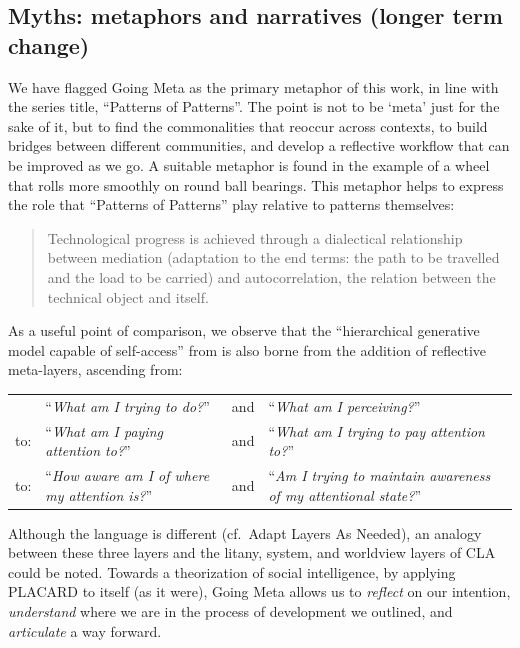\documentclass[acmlarge,timestamp]{acmart}
\begin{document}
\subsection{Myths: metaphors and narratives (longer term change)}
We have flagged {\sc Going Meta} as the primary metaphor of this work,
in line with the series title, “Patterns of Patterns”.  The point is
not to be ‘meta’ just for the sake of it, but to find the
commonalities that reoccur across contexts, to build bridges between
different communities, and develop a reflective workflow that can be
improved as we go.  A suitable metaphor is found in the example of a
wheel that rolls more smoothly on round ball bearings.  This metaphor
helps to express the role that “Patterns of Patterns” play relative to
patterns themselves:
\begin{quote}
Technological progress is achieved through a dialectical relationship
between mediation (adaptation to the end terms: the path to be
travelled and the load to be carried) and autocorrelation, the
relation between the technical object and
itself. \cite{Simondon2005-pq}
\end{quote}
As a useful point of comparison, we observe that the “hierarchical
generative model capable of self-access” from
\citet{albarracin2023designing} is also borne from the addition of
reflective meta-layers, ascending from:

{
\renewcommand*{\arraystretch}{1.2}
\begin{tabular}{lllp{}}
  &``\emph{What am I trying to do?}''&and&``\emph{What am I perceiving?}''\\
to:&``\emph{What am I paying attention to?}''&and&``\emph{What am I trying to pay attention to?}''\\
to:&``\emph{How aware am I of where my attention is?}''&and&``\emph{Am I trying to maintain awareness of my \phantom{X} attentional state?}''
\end{tabular}
}

\medskip
\noindent Although the language is different (cf.~{\sc Adapt Layers As
  Needed}), an analogy between these three layers and the litany,
system, and worldview layers of CLA could be noted.  Towards a
theorization of social intelligence, by applying PLACARD to itself (as
it were), {\sc Going Meta} allows us to \emph{reflect} on our
intention, \emph{understand} where we are in the process of
development we outlined, and \emph{articulate} a way forward.


\renewcommand\bibname{References}
\renewcommand\refname{References}
\end{document}
